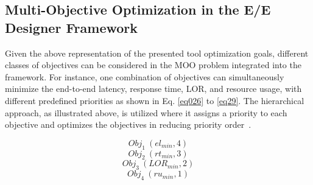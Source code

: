     
    \subsection{Multi-Objective Optimization in the E/E Designer Framework}
    
    Given the above representation of the presented tool optimization goals, different classes of objectives can be considered in the MOO problem integrated into the framework. For instance, one combination of objectives can simultaneously minimize the end-to-end latency, response time, LOR, and resource usage, with different predefined priorities as shown in Eq. \eqref{eq026} to \eqref{eq29}. The hierarchical approach, as illustrated above, is utilized where it assigns a priority to each objective and optimizes the objectives in reducing priority order~\cite{askaripoor2023designer}.
    
    
    
    \begin{equation}
    	Obj_{1}~(el_{min}, 4)  
    	\label{eq026}
    \end{equation}
    \begin{equation}
    	Obj_2~(rt_{min}, 3)  
    	\label{eq27}
    \end{equation}
       \begin{equation}
    	Obj_3~(LOR_{min}, 2)  
    	\label{eq28}
    \end{equation}
    \begin{equation}
    	Obj_4~(ru_{min}, 1)  
    	\label{eq29}
    \end{equation}\newline
 
